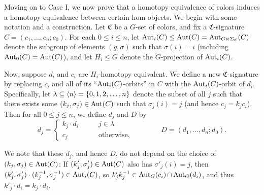 \documentclass[a4paper,10pt
,draft
]{article}%
\renewcommand{\1}{\eta}%
\begin{document}
Moving on to Case I, we now prove that a homotopy equivalence of colors induces a homotopy equivalence between certain hom-objects.
% 
We begin with some notation and a construction.
Let $\mathfrak C$ be a $G$-set of colors, and fix a $\mathfrak C$-signature $C = (c_1, \dots, c_n; c_0)$.
For each $0 \leq i \leq n$, let $\operatorname{Aut}_i(C) \leq \operatorname{Aut}(C) = \operatorname{Aut}_{G \ltimes \Sigma_{\mathfrak C}}(C)$ denote the subgroup of elements $(g, \sigma)$
such that $\sigma(i) = i$ (including $\operatorname{Aut}_0(C) = \operatorname{Aut}(C)$),
and let $H_i \leq G$ denote the $G$-projection of $\operatorname{Aut}_i(C)$.

Now, suppose $d_i$ and $c_i$ are $H_i$-homotopy equivalent.
We define a new $\mathfrak C$-signature by replacing $c_i$ and all of its ``$\operatorname{Aut}_i(C)$-orbits'' in $C$ with
the $\operatorname{Aut}_i(C)$-orbit of $d_i$.
Specifically, let $\lambda \subseteq \langle n \rangle = \left\{0,1,2,\dots,n\right\}$ denote the subset of all $j$ such that
there exists some $(k_j, \sigma_j) \in \operatorname{Aut}(C)$ such that $\sigma_j(i) = j$ (and hence $c_j = k_j c_i$).
Then for all $0 \leq j \leq n$, we define $d_j$ and $D$ by
\begin{equation}
      \label{DDEF_EQ}
      d_j =
      \begin{cases}
            k_j \cdot d_i \qquad & j \in \lambda
            \\
            c_j & \mbox{otherwise,}
      \end{cases}
      \qquad \qquad
      D = (d_1,\dots, d_n; d_0).
\end{equation}

\begin{remark}
      We note that these $d_j$, and hence $D$, do not depend on the choice of $(k_j,\sigma_j) \in \operatorname{Aut}(C)$:
      If $(k'_j, \sigma'_j) \in \operatorname{Aut}(C)$ also has $\sigma'_j(i) = j$, then
      $(k'_j, \sigma'_j) \cdot (k_j^{-1}, \sigma_j^{-1}) \in \operatorname{Aut}_i(C)$,
      so $k'_j k_j^{-1} \in \operatorname{Aut}_G(c_i) \mathop{\cap} \operatorname{Aut}_G(d_i)$,
      and thus $k'_j \cdot d_i = k_j \cdot d_i$.
\end{remark}
\end{document}
